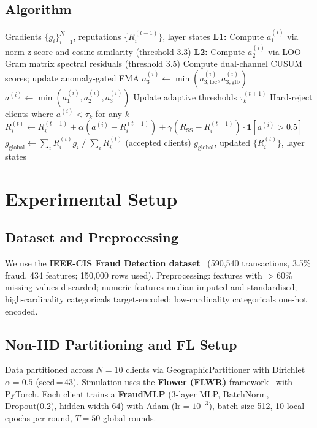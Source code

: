 \documentclass[journal]{IEEEtran}
\newcommand{\sysname}{TRAP}
\begin{document}
\subsection{Algorithm}
\begin{algorithm}[H]
\caption{\sysname{} Cascade Router Aggregation}
\label{alg:trap}
\begin{algorithmic}[1]
\REQUIRE Gradients $\{g_i\}_{i=1}^N$, reputations $\{R_i^{(t-1)}\}$, layer states
\STATE \textbf{L1:} Compute $a_1^{(i)}$ via norm z-score and cosine similarity (threshold 3.3)
\STATE \textbf{L2:} Compute $a_2^{(i)}$ via LOO Gram matrix spectral residuals (threshold 3.5)
  \STATE Compute dual-channel CUSUM scores; update anomaly-gated EMA
  \STATE $a_3^{(i)} \leftarrow \min(a_{3,\mathrm{loc}}^{(i)}, a_{3,\mathrm{glb}}^{(i)})$
\ENDFOR
\STATE $a^{(i)} \leftarrow \min(a_1^{(i)}, a_2^{(i)}, a_3^{(i)})$
\STATE Update adaptive thresholds $\tau_k^{(t+1)}$
\STATE Hard-reject clients where $a^{(i)} < \tau_k$ for any $k$
\STATE $R_i^{(t)} \leftarrow R_i^{(t-1)} + \alpha(a^{(i)} - R_i^{(t-1)}) + \gamma(R_{\mathrm{SS}} - R_i^{(t-1)}) \cdot \mathbf{1}[a^{(i)}>0.5]$
\STATE $g_{\mathrm{global}} \leftarrow \sum_i R_i^{(t)} g_i \;/\; \sum_i R_i^{(t)}$ (accepted clients)
\RETURN $g_{\mathrm{global}}$, updated $\{R_i^{(t)}\}$, layer states
\end{algorithmic}
\end{algorithm}

\section{Experimental Setup}

\subsection{Dataset and Preprocessing}
We use the \textbf{IEEE-CIS Fraud Detection dataset}~\cite{kaggle2019ieeecis}
(590,540 transactions, 3.5\% fraud, 434 features; 150,000 rows used).
Preprocessing: features with $>$60\% missing values discarded; numeric
features median-imputed and standardised; high-cardinality categoricals
target-encoded; low-cardinality categoricals one-hot encoded.

\subsection{Non-IID Partitioning and FL Setup}
Data partitioned across $N{=}10$ clients via GeographicPartitioner with
Dirichlet $\alpha{=}0.5$ (seed\,=\,43). Simulation uses the
\textbf{Flower (FLWR)} framework~\cite{bonawitz2019federated} with PyTorch.
Each client trains a \textbf{FraudMLP} (3-layer MLP, BatchNorm,
Dropout(0.2), hidden width 64) with Adam ($\mathrm{lr}{=}10^{-3}$),
batch size 512, 10 local epochs per round, $T{=}50$ global rounds.
\end{document}
